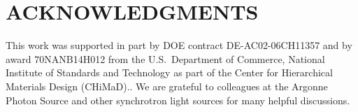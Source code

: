 \documentclass{aip-cp}
\begin{document}
\section{ACKNOWLEDGMENTS}

This work was supported in part by DOE contract DE-AC02-06CH11357 and by award 70NANB14H012 from the U.S.\  Department of Commerce, National Institute of Standards and Technology as part of the Center for Hierarchical Materials Design (CHiMaD)..
We are grateful to colleagues at the Argonne Photon Source and other synchrotron light sources
for many helpful discussions.


\nocite{*}
%
%
\end{document}

